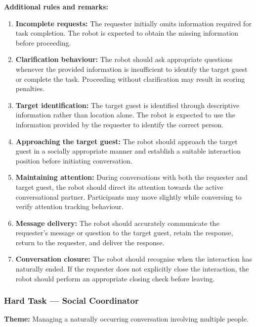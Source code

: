 \medskip
\noindent \textbf{Additional rules and remarks:}
\begin{enumerate}[nosep]
	\item \textbf{Incomplete requests:} The requester initially omits information required for task completion. The robot is expected to obtain the missing information before proceeding.
	\item \textbf{Clarification behaviour:} The robot should ask appropriate questions whenever the provided information is insufficient to identify the target guest or complete the task. Proceeding without clarification may result in scoring penalties.
	\item \textbf{Target identification:} The target guest is identified through descriptive information rather than location alone. The robot is expected to use the information provided by the requester to identify the correct person.
	\item \textbf{Approaching the target guest:} The robot should approach the target guest in a socially appropriate manner and establish a suitable interaction position before initiating conversation.
	\item \textbf{Maintaining attention:} During conversations with both the requester and target guest, the robot should direct its attention towards the active conversational partner. Participants may move slightly while conversing to verify attention tracking behaviour.
	\item \textbf{Message delivery:} The robot should accurately communicate the requester's message or question to the target guest, retain the response, return to the requester, and deliver the response.
	\item \textbf{Conversation closure:} The robot should recognise when the interaction has naturally ended. If the requester does not explicitly close the interaction, the robot should perform an appropriate closing check before leaving.
\end{enumerate}

\subsubsection*{Hard Task --- Social Coordinator}

\noindent \textbf{Theme:}
Managing a naturally occurring conversation involving multiple people.


